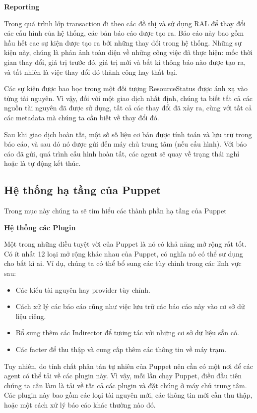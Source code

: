 \textbf{\large Reporting}


Trong quá trình lớp transaction đi theo các đồ thị và sử dụng RAL để thay đổi các cấu hình của hệ thống, các bản báo cáo được tạo ra. Báo cáo này bao gồm hầu hết cac sự kiện được tạo ra bởi những thay đổi trong hệ thống. Những sự kiện này, chúng là phản ảnh toàn diện về những công việc đã thực hiện: mốc thời gian thay đổi, giá trị trước đó, giá trị mới và bất kì thông báo nào được tạo ra, và tất nhiên là việc thay đổi đó thành công hay thất bại.

Các sự kiện được bao bọc trong một đối tượng ResourceStatus được ánh xạ vào từng tài nguyên. Vì vậy, đối với một giao dịch nhất định, chúng ta biết tất cả các nguồn tài nguyên đã được sử dụng, tất cả các thay đổi đã xảy ra, cùng với tất cả các metadata mà chúng ta cần biết về thay đổi đó.

Sau khi giao dịch hoàn tất, một số số liệu cơ bản được tính toán và lưu trữ trong báo cáo, và sau đó nó được gửi đến máy chủ trung tâm (nếu cấu hình). Với báo cáo đã gửi, quá trình cấu hình hoàn tất, các agent sẽ quay về trạng thái nghỉ hoặc là tự động kết thúc.


\subsection{Hệ thống hạ tầng của Puppet}

Trong mục này chúng ta sẽ tìm hiểu các thành phần hạ tầng của Puppet

\textbf{\large Hệ thống các Plugin}

Một trong những điều tuyệt vời của Puppet là nó có khả năng mở rộng rất tốt. Có ít nhất 12 loại mở rộng khác nhau của Puppet, có nghĩa nó có thể sư dụng cho bất kì ai. Ví dụ, chúng ta có thể bổ sung các tùy chỉnh trong các lĩnh vực sau:

\begin{itemize}
\item Các kiểu tài nguyên hay provider tùy chỉnh.
\item Cách xử lý các báo cáo cũng như việc lưu trữ các báo cáo này vào cơ sở dữ liệu riêng.
\item Bổ sung thêm các Indirector để tương tác với những cơ sở dữ liệu sẵn có.
\item Các facter để thu thập và cung cấp thêm các thông tin về máy trạm.
\end{itemize}

Tuy nhiên, do tính chất phân tán tự nhiên của Puppet nên cần có một nơi để các agent có thể tải về các plugin này. Vì vậy, mỗi lần chạy Puppet, điều đầu tiên chúng ta cần làm là tải về tất cả các plugin và đặt chúng ở máy chủ trung tâm. Các plugin này bao gồm các loại tài nguyên mới, các thông tin mới cần thu thập, hoặc một cách xử lý báo cáo khác thường nào đó.

